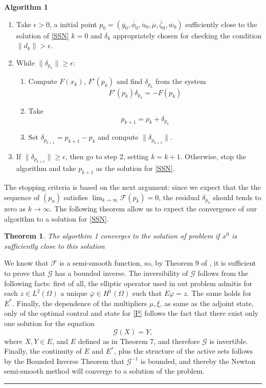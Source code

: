 \documentclass[11pt,a4paper]{amsart}
\newcommand{\kw}{\rule{2mm}{2mm}}
\newcommand{\om}{\Omega}
\renewenvironment{proof}{{Proof.}}{\hfill\kw}
\newtheorem{theorem}{{Theorem}}
\newcommand{\norm}[1]{\lVert #1 \rVert}
\begin{document}
\textbf{Algorithm 1}
\begin{enumerate}
    \item 
    Take $\epsilon>0$, a initial point $p_0=(\overline{y}_0,\overline{\phi}_0,\overline{u}_0,\overline{\mu},\overline{\zeta}_0,\overline{w}_0)$ sufficiently close to the solution of \eqref{SSN} $k=0$ and $\delta_{k}$ appropriately chosen for checking the condition $\norm{d_k}>\epsilon$.    
    \item
       While $\norm{\delta_{p_k}}\ge \epsilon$:
        \begin{enumerate}
            \item 
            Compute $F(x_k)$, $F'(p_k)$ and find $\delta_{p_{k}}$ from the system
            \[
                F'(p_k)\delta_{p_{k}}=-F(p_k)
            \]
            \item
                Take
                \[
                    p_{k+1}=p_k+\delta_{p_k}
                \]
            \item
                Set $\delta_{p_{k+1}}=p_{k+1}-p_{k}$ and compute $\norm{\delta_{p_{k+1}}}$. 
            \end{enumerate}
        \item
        If $\norm{\delta_{p_{k+1}}}\ge \epsilon$, then go to step 2, setting $k=k+1$.  Otherwise, stop the algorithm and take $p_{k+1}$ as the solution for \eqref{SSN}.
\end{enumerate}

The stopping criteria is based on the next argument: since we expect that the the sequence of $(p_n)$ satisfies $\lim_{k\to\infty}\mathcal{F}(p_k)=0$,
the residual $\delta_{p_{n}}$ should tends to zero as $k\to \infty$. The following theorem allow us to expect the convergence of our algorithm to a solution for \eqref{SSN}.

\begin{theorem}
    The algorthim 1 converges to the solution of problem  if $x^0$ is sufficiently close to this solution  
\end{theorem}

\begin{proof}
    We know that $\mathcal{F}$ is a semi-smooth function, so, by Theorem 9 of \cite{stadler}, it is sufficient to prove that $\mathcal{G}$ has a bounded inverse. The inversibility of $\mathcal{G}$ follows from the following facts: first of all, the elliptic operator used in out problem admitis for each $z\in L^2(\om)$ a unique $\overline{\varphi}\in H^1(\om)$ such that $E\varphi=z$. The same holds for $E^*$. Finally, the dependence of the multipliers $\mu, \xi$, as same as the adjoint state, only of the optimal control and state for \eqref{P} follows the fact that there exist only one solution for the equation 
    \[
    \mathcal{G}(X)=Y,
    \]
    where $X,Y\in E$, and $E$ defined as in Theorem 7, and therefore $\mathcal{G}$ is invertible. Finally, the continuity of $E$ and $E^*$, plus the structure of the active sets follows by the Bounded Inverse Theorem that $\mathcal{G}^{-1}$ is bounded, and thereby the Newton semi-smooth method will converge to a solution of the problem.    
\end{proof}
\end{document}
